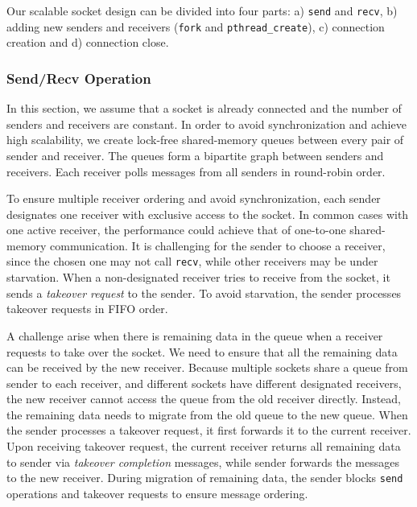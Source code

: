 Our scalable socket design can be divided into four parts: a) \texttt{send} and \texttt{recv}, b) adding new senders and receivers (\texttt{fork} and \texttt{pthread\_create}), c) connection creation and d) connection close.

\subsubsection{Send/Recv Operation}
\label{subsubsec:fork_rdwr}

In this section, we assume that a socket is already connected and the number of senders and receivers are constant. In order to avoid synchronization and achieve high scalability, we create lock-free shared-memory queues between every pair of sender and receiver. The queues form a bipartite graph between senders and receivers. Each receiver polls messages from all senders in round-robin order.

To ensure multiple receiver ordering and avoid synchronization, each sender designates one receiver with exclusive access to the socket. In common cases with one active receiver, the performance could achieve that of one-to-one shared-memory communication. It is challenging for the sender to choose a receiver, since the chosen one may not call \texttt{recv}, while other receivers may be under starvation. When a non-designated receiver tries to receive from the socket, it sends a \textit{takeover request} to the sender. To avoid starvation, the sender processes takeover requests in FIFO order.

A challenge arise when there is remaining data in the queue when a receiver requests to take over the socket. We need to ensure that all the remaining data can be received by the new receiver. Because multiple sockets share a queue from sender to each receiver, and different sockets have different designated receivers, the new receiver cannot access the queue from the old receiver directly. Instead, the remaining data needs to migrate from the old queue to the new queue. When the sender processes a takeover request, it first forwards it to the current receiver. Upon receiving takeover request, the current receiver returns all remaining data to sender via \textit{takeover completion} messages, while sender forwards the messages to the new receiver. During migration of remaining data, the sender blocks \texttt{send} operations and takeover requests to ensure message ordering.


